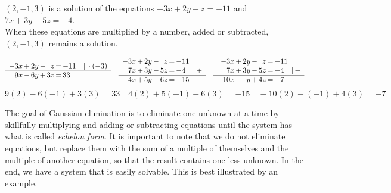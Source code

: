 \documentclass[12pt,eng]{skript_ogg}
\begin{document}
\vspace{-2mm}

\begin{beispiel}
$(2,-1,3)$ is a solution of the equations
$-3x+2y-z=-11$ and $7x+3y-5z=-4$.\\ When these equations are multiplied by a number, added or subtracted, $(2,-1,3)$ remains a solution.

\vspace{-10mm}

\[\begin{array}{r@{\,}c@{\,}r@{\,}c@{\,}r@{\,}c@{\,}l}
-3x & + & 2y & - & z & = & -11\quad|\,\cdot(-3)\\ \hline
9x  & - & 6y & + & 3z & = & 33
\end{array}\quad\begin{array}{r@{\,}c@{\,}r@{\,}c@{\,}r@{\,}c@{\,}l}
-3x & + & 2y & - & z  & = & -11 \\
7x  & + & 3y & - & 5z & = & -4\quad|\,+\\ \hline
4x  & + & 5y & - & 6z & = & -15
\end{array}\quad\begin{array}{r@{\,}c@{\,}r@{\,}c@{\,}r@{\,}c@{\,}l}
-3x & + & 2y & - & z & = & -11 \\
7x  & + & 3y & - & 5z & = & -4\quad|\,-\\ \hline
-10x & - & y & + & 4z & = & -7
\end{array}\]
\[9(2)-6(-1)+3(3)=33\quad4(2)+5(-1)-6(3)=-15\quad-10(2)-(-1)+4(3)=-7\]
\end{beispiel}

The goal of Gaussian elimination is to eliminate one unknown at a time by skillfully multiplying and adding or subtracting equations until the system has what is called \emph{echelon form}. It is important to note that we do not eliminate equations, but replace them with the sum of a multiple of themselves and the multiple of another equation, so that the result contains one less unknown. In the end, we have a system that is easily solvable. This is best illustrated by an example.
\end{document}
